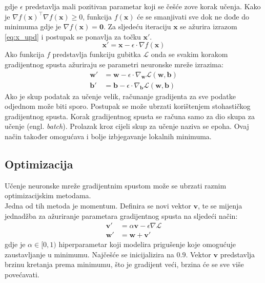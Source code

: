 \documentclass[times, utf8, zavrsni, numeric]{fer}
\renewcommand{\vec}[1]{\mathbf{#1}}
\begin{document}
gdje $\epsilon$ predstavlja mali pozitivan parametar koji se češće zove
korak učenja. Kako je $\nabla f(\vec{x})^\top \nabla f(\vec{x}) \geq 0$,
funkcija $f(\vec{x})$ će se smanjivati sve dok ne dođe do minimuma gdje je
$\nabla f(\vec{x}) = \vec{0}$. Za sljedeću iteraciju $\vec{x}$ se ažurira 
izrazom \ref{eq:x_upd} i postupak se ponavlja za točku $\vec{x}'$.
\begin{equation}
	\vec{x}' = \vec{x} - \epsilon\cdot \nabla f(\vec{x})
	\label{eq:x_upd}
\end{equation}
\indent Ako funkcija $f$ predstavlja funkciju gubitka $\mathcal{L}$ 
onda se svakim korakom
gradijentnog spusta ažuriraju se parametri neuronske mreže izrazima:
\begin{align}
	\vec{w}' &= \vec{w} - \epsilon \cdot \nabla_\vec{w} \mathcal{L}(\vec{w}, 
	\vec{b}) \\
	\vec{b}' &= \vec{b} - \epsilon \cdot \nabla_\vec{b} \mathcal{L}(\vec{w}, 
	\vec{b})
\end{align}
\indent Ako je skup podatak za učenje velik, računanje gradijenta za sve podatke
odjednom može biti sporo. Postupak se može ubrzati korištenjem stohastičkog
gradijentnog spusta. Korak gradijentnog spusta se računa samo za dio skupa za 
učenje (engl. \textit{batch}). Prolazak kroz cijeli skup za učenje naziva se 
epoha. Ovaj način također omogućava i bolje izbjegavanje lokalnih minimuma.

\subsection{Optimizacija}
Učenje neuronske mreže gradijentnim spustom može se ubrzati raznim 
optimizacijskim metodama. 
\\\indent Jedna od tih metoda je momentum. Definira se novi vektor $\vec{v}$,
te se mijenja jednadžba za ažuriranje parametara gradijentnog spusta
na sljedeći način:
\begin{equation}
\begin{aligned}
	\vec{v}' &= \alpha \vec{v} - \epsilon \nabla \mathcal{L} \\
	\vec{w}' &= \vec{w} + \vec{v}'
\end{aligned}
\end{equation}
gdje je $\alpha \in [0, 1)$ hiperparametar koji modelira prigušenje koje
omogućuje zaustavljanje u minimumu. Najčešće se inicijalizira na $0.9$. 
Vektor $\vec{v}$ predstavlja brzinu kretanja prema minimumu, što je gradijent
veći, brzina će se sve više povećavati.
\end{document}
